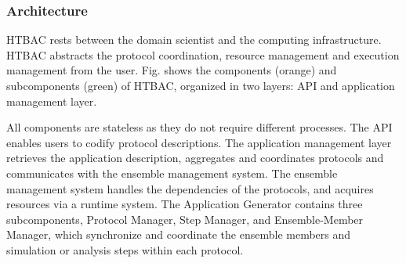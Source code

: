 




\subsubsection{Architecture}



HTBAC rests between the domain scientist and the computing infrastructure.
HTBAC abstracts the protocol coordination, resource management and execution
management from the user. Fig.  shows the components (orange) and subcomponents (green) of HTBAC,
organized in two layers: API and application management layer.

All components are stateless as they do not require different processes. The
API enables users to codify protocol descriptions. The  application
management layer retrieves the application description, aggregates and
coordinates protocols and communicates with the ensemble management system.
The ensemble management system handles the dependencies of the protocols, and
acquires resources via a runtime system. The Application Generator contains
three subcomponents, Protocol Manager, Step Manager, and Ensemble-Member
Manager, which synchronize and coordinate the ensemble members and simulation
or analysis steps within each protocol.

